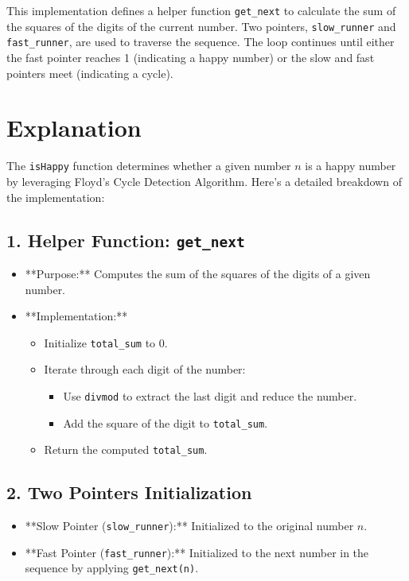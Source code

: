 This implementation defines a helper function \texttt{get\_next} to calculate the sum of the squares of the digits of the current number. Two pointers, \texttt{slow\_runner} and \texttt{fast\_runner}, are used to traverse the sequence. The loop continues until either the fast pointer reaches 1 (indicating a happy number) or the slow and fast pointers meet (indicating a cycle).

\section*{Explanation}

The \texttt{isHappy} function determines whether a given number \(n\) is a happy number by leveraging Floyd's Cycle Detection Algorithm. Here's a detailed breakdown of the implementation:

\subsection*{1. Helper Function: \texttt{get\_next}}

\begin{itemize}
    \item **Purpose:** Computes the sum of the squares of the digits of a given number.
    \item **Implementation:**
    \begin{itemize}
        \item Initialize \texttt{total\_sum} to 0.
        \item Iterate through each digit of the number:
        \begin{itemize}
            \item Use \texttt{divmod} to extract the last digit and reduce the number.
            \item Add the square of the digit to \texttt{total\_sum}.
        \end{itemize}
        \item Return the computed \texttt{total\_sum}.
    \end{itemize}
\end{itemize}

\subsection*{2. Two Pointers Initialization}

\begin{itemize}
    \item **Slow Pointer (\texttt{slow\_runner}):** Initialized to the original number \(n\).
    \item **Fast Pointer (\texttt{fast\_runner}):** Initialized to the next number in the sequence by applying \texttt{get\_next(n)}.
\end{itemize}

